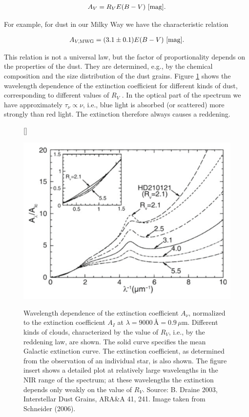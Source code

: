 \documentclass[a4paper,11pt]{article}
\begin{document}
\begin{align*}
    A_V = R_V E(B-V) ~ [{\rm mag}].
\end{align*}

{\noindent}For example, for dust in our Milky Way we have the characteristic relation

\begin{align*}
    A_{V,\mathrm{MWG}} = (3.1\pm0.1)E(B-V) ~ [{\rm mag}].
\end{align*}

{\noindent}This relation is not a universal law, but the factor of proportionality depends on the properties of the dust. They are determined, e.g., by the chemical composition and the size distribution of the dust grains. Figure \ref{fig:extinctioncurve} shows the wavelength dependence of the extinction coefficient for different kinds of dust, corresponding to different values of $R_V$ . In the optical part of the spectrum we have approximately $\tau_\nu\propto\nu$, i.e., blue light is absorbed (or scattered) more strongly than red light. The extinction therefore always causes a reddening.

\begin{figure}[h]
    [\FBwidth]
    {\caption{\footnotesize{Wavelength dependence of the extinction coefficient $A_\nu$, normalized to the extinction coefficient $A_I$ at $\lambda=9000$\,\AA$ = 0.9\,\mu$m. Different kinds of clouds, characterized by the value of $R_V$, i.e., by the reddening law, are shown. The solid curve specifies the mean Galactic extinction curve. The extinction coefficient, as determined from the observation of an individual star, is also shown. The figure insert shows a detailed plot at relatively large wavelengths in the NIR range of the spectrum; at these wavelengths the extinction depends only weakly on the value of $R_V$. Source: B. Draine 2003, Interstellar Dust Grains, ARA\&A 41, 241. Image taken from Schneider (2006).}}
    \label{fig:extinctioncurve}}
    {\includegraphics[width=12cm]{figures/ExtinctionCurve.png}}
\end{figure}
\end{document}
